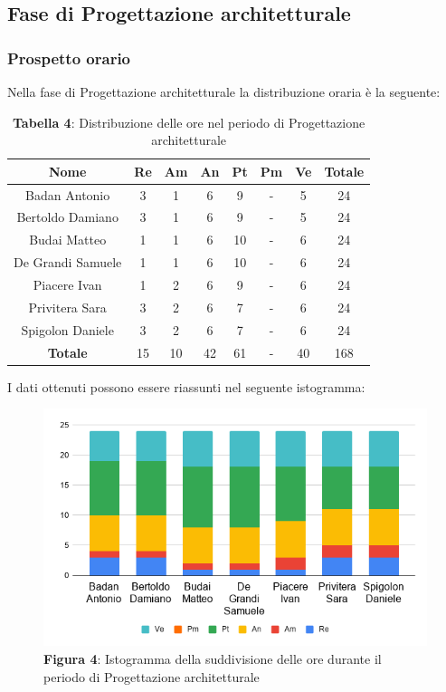 \subsection{Fase di Progettazione architetturale}
\subsubsection{Prospetto orario}
Nella fase di Progettazione architetturale la distribuzione oraria è la seguente:

\begin{table}[H]
	\centering
	\renewcommand{\arraystretch}{1.5}
	\begin{tabular}{|c|c|c|c|c|c|c|c|}
		\hline
		\rowcolor{lighter-grayer}
Nome & Re & Am & An & Pt & Pm & Ve & Totale \\ \hline
Badan Antonio & 3 & 1 & 6 & 9 & - & 5 & 24 \\ \hline
Bertoldo Damiano & 3 & 1 & 6 & 9 & - & 5 & 24 \\ \hline
Budai Matteo & 1 & 1 & 6 & 10 & - & 6 & 24 \\ \hline
De Grandi Samuele & 1 & 1 & 6 & 10 & - & 6 & 24 \\ \hline
Piacere Ivan & 1 & 2 & 6 & 9 & - & 6 & 24 \\ \hline
Privitera Sara & 3 & 2 & 6 & 7 & - & 6 & 24 \\ \hline
Spigolon Daniele & 3 & 2 & 6 & 7 & - & 6 & 24 \\ \hline
\textbf{Totale} & 15 & 10 & 42 & 61 & - & 40 & 168 \\ \hline
	\end{tabular}
	\caption*{\textbf{Tabella 4}: Distribuzione delle ore nel periodo di Progettazione architetturale\\}
\end{table}	
I dati ottenuti possono essere riassunti nel seguente istogramma:

\begin{figure}[H]
	\centering
	\includegraphics[width=0.7\linewidth]{res/images/IstogrammaFase2.png}
	\caption*{\textbf{Figura 4}: Istogramma della suddivisione delle ore durante il periodo di Progettazione architetturale}
	\label{fig:Figura10}
\end{figure}


